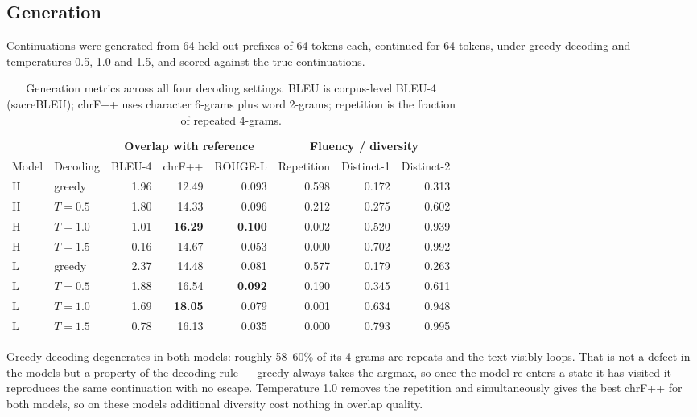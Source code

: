 \documentclass[10pt]{article}
\begin{document}
\subsection{Generation}

Continuations were generated from 64 held-out prefixes of 64 tokens each, continued
for 64 tokens, under greedy decoding and temperatures 0.5, 1.0 and 1.5, and scored
against the true continuations.

\begin{table}[!htb]
\centering\small
\caption{Generation metrics across all four decoding settings. BLEU is corpus-level
BLEU-4 (sacreBLEU); chrF++ uses character 6-grams plus word 2-grams; repetition is
the fraction of repeated 4-grams.}
\label{tab:generation}
\begin{tabular}{llrrrrrr}
\toprule
& & \multicolumn{3}{c}{\textbf{Overlap with reference}} & \multicolumn{3}{c}{\textbf{Fluency / diversity}} \\
\cmidrule(lr){3-5}\cmidrule(lr){6-8}
Model & Decoding & BLEU-4 & chrF++ & ROUGE-L & Repetition & Distinct-1 & Distinct-2 \\
\midrule
H & greedy  & 1.96 & 12.49 & 0.093 & 0.598 & 0.172 & 0.313 \\
H & $T=0.5$ & 1.80 & 14.33 & 0.096 & 0.212 & 0.275 & 0.602 \\
H & $T=1.0$ & 1.01 & \textbf{16.29} & \textbf{0.100} & 0.002 & 0.520 & 0.939 \\
H & $T=1.5$ & 0.16 & 14.67 & 0.053 & 0.000 & 0.702 & 0.992 \\
\midrule
L & greedy  & 2.37 & 14.48 & 0.081 & 0.577 & 0.179 & 0.263 \\
L & $T=0.5$ & 1.88 & 16.54 & \textbf{0.092} & 0.190 & 0.345 & 0.611 \\
L & $T=1.0$ & 1.69 & \textbf{18.05} & 0.079 & 0.001 & 0.634 & 0.948 \\
L & $T=1.5$ & 0.78 & 16.13 & 0.035 & 0.000 & 0.793 & 0.995 \\
\bottomrule
\end{tabular}
\end{table}

Greedy decoding degenerates in both models: roughly 58--60\% of its 4-grams are
repeats and the text visibly loops. That is not a defect in the models but a property
of the decoding rule --- greedy always takes the argmax, so once the model re-enters
a state it has visited it reproduces the same continuation with no escape. Temperature
1.0 removes the repetition and simultaneously gives the best chrF++ for both models,
so on these models additional diversity cost nothing in overlap quality.
\end{document}
